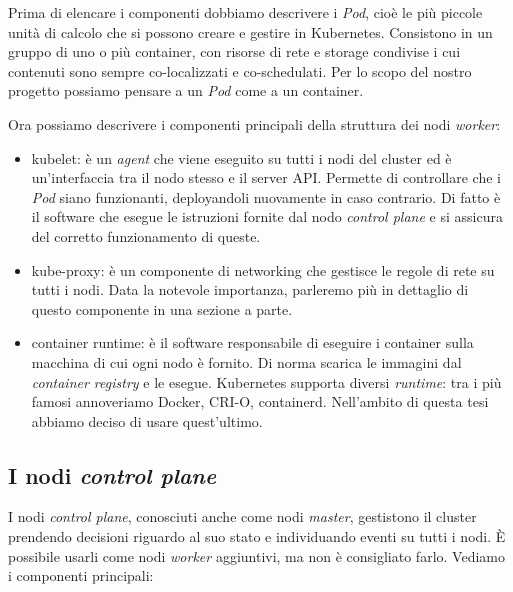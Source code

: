 \documentclass[12pt, hidelinks]{report}
\begin{document}
Prima di elencare i componenti dobbiamo descrivere i \textit{Pod}, cioè le più piccole unità di calcolo che si possono creare e gestire in Kubernetes. Consistono in un gruppo di uno o più container, con risorse di rete e storage condivise i cui contenuti sono sempre co-localizzati e co-schedulati. Per lo scopo del nostro progetto possiamo pensare a un \textit{Pod} come a un container. 

Ora possiamo descrivere i componenti principali della struttura dei nodi \textit{worker}:

\begin{itemize}
    \item kubelet: è un \textit{agent} che viene eseguito su tutti i nodi del cluster ed è un'interfaccia tra il nodo stesso e il server API. Permette di controllare che i \textit{Pod} siano funzionanti, deployandoli nuovamente in caso contrario. Di fatto è il software che esegue le istruzioni fornite dal nodo \textit{control plane} e si assicura del corretto funzionamento di queste.
    \item kube-proxy: è un componente di networking che gestisce le regole di rete su tutti i nodi. Data la notevole importanza, parleremo più in dettaglio di questo componente in una sezione a parte.
    \item container runtime: è il software responsabile di eseguire i container sulla macchina di cui ogni nodo è fornito. Di norma scarica le immagini dal \textit{container registry} e le esegue. Kubernetes supporta diversi \textit{runtime}: tra i più famosi annoveriamo Docker, CRI-O, containerd. Nell'ambito di questa tesi abbiamo deciso di usare quest'ultimo.
\end{itemize}

\subsection{I nodi \textit{control plane}}
I nodi \textit{control plane}, conosciuti anche come nodi \textit{master}, gestistono il cluster prendendo decisioni riguardo al suo stato e individuando eventi su tutti i nodi. È possibile usarli come nodi \textit{worker} aggiuntivi, ma non è consigliato farlo. Vediamo i componenti principali:
\end{document}
